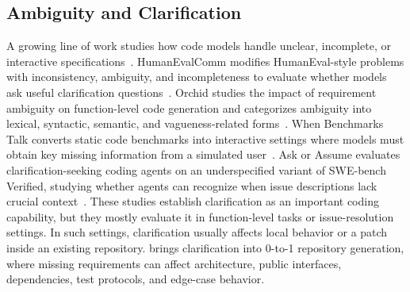 \subsection{Ambiguity and Clarification}

A growing line of work studies how code models handle unclear, incomplete, or interactive specifications~\cite{jin2026reqelicitgymevaluationenvironmentinterview,li2023pythoncodegenerationasking,Fakhoury_2024}. 
HumanEvalComm modifies HumanEval-style problems with inconsistency, ambiguity, and incompleteness to evaluate whether models ask useful clarification questions~\cite{Wu_2025}. 
Orchid studies the impact of requirement ambiguity on function-level code generation and categorizes ambiguity into lexical, syntactic, semantic, and vagueness-related forms~\cite{yang2026assessingimpactrequirementambiguity}. 
When Benchmarks Talk converts static code benchmarks into interactive settings where models must obtain key missing information from a simulated user~\cite{pan2025benchmarkstalkreevaluatingcode}. 
Ask or Assume evaluates clarification-seeking coding agents on an underspecified variant of SWE-bench Verified, studying whether agents can recognize when issue descriptions lack crucial context~\cite{edwards2026askassumeuncertaintyawareclarificationseeking}. 
These studies establish clarification as an important coding capability, but they mostly evaluate it in function-level tasks or issue-resolution settings. In such settings, clarification usually affects local behavior or a patch inside an existing repository. \rcb{} brings clarification into 0-to-1 repository generation, where missing requirements can affect architecture, public interfaces, dependencies, test protocols, and edge-case behavior. 
